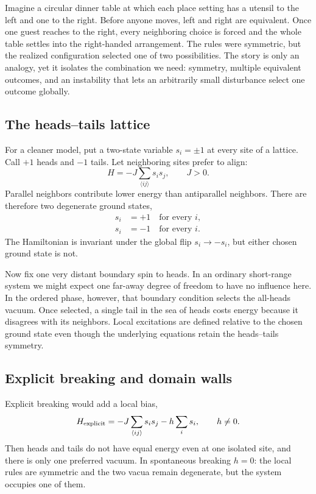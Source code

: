 Imagine a circular dinner table at which each place setting has a utensil to
the left and one to the right. Before anyone moves, left and right are
equivalent. Once one guest reaches to the right, every neighboring choice is
forced and the whole table settles into the right-handed arrangement. The
rules were symmetric, but the realized configuration selected one of two
possibilities. The story is only an analogy, yet it isolates the combination
we need: symmetry, multiple equivalent outcomes, and an instability that lets
an arbitrarily small disturbance select one outcome globally.

\subsection{The heads--tails lattice}

For a cleaner model, put a two-state variable \(s_i=\pm1\) at every site of a
lattice. Call \(+1\) heads and \(-1\) tails. Let neighboring sites prefer to
align:
\begin{equation}
  H=-J\sum_{\langle ij\rangle}s_i s_j,
  \qquad J>0.
\end{equation}
Parallel neighbors contribute lower energy than antiparallel neighbors.
There are therefore two degenerate ground states,
\begin{equation}
\begin{aligned}
  s_i&=+1\quad\text{for every }i,
  \\
  s_i&=-1\quad\text{for every }i.
\end{aligned}
\end{equation}
The Hamiltonian is invariant under the global flip \(s_i\to-s_i\), but either
chosen ground state is not.

Now fix one very distant boundary spin to heads. In an ordinary short-range
system we might expect one far-away degree of freedom to have no influence
here. In the ordered phase, however, that boundary condition selects the
all-heads vacuum. Once selected, a single tail in the sea of heads costs
energy because it disagrees with its neighbors. Local excitations are defined
relative to the chosen ground state even though the underlying equations
retain the heads--tails symmetry.

\subsection{Explicit breaking and domain walls}

Explicit breaking would add a local bias,
\begin{equation}
  H_{\rm explicit}
  =-J\sum_{\langle ij\rangle}s_i s_j-h\sum_i s_i,
  \qquad h\ne0.
\end{equation}
Then heads and tails do not have equal energy even at one isolated site, and
there is only one preferred vacuum. In spontaneous breaking \(h=0\): the
local rules are symmetric and the two vacua remain degenerate, but the system
occupies one of them.

